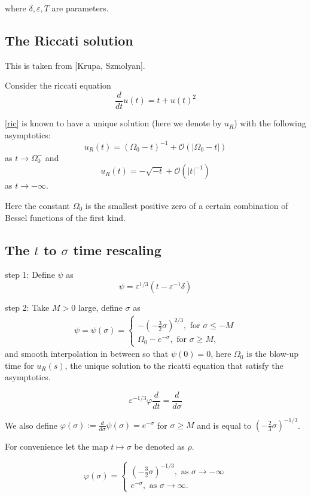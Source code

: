\documentclass[letterpaper,11pt]{article}
\newcommand{\rmO}{\mathcal{O}}
\newcommand{\eps}{\varepsilon}
\numberwithin{equation}{section}
\theoremstyle{plain}
\begin{document}
where $\delta,\eps, T$ are parameters.

\subsection{The Riccati solution}
This is taken from [Krupa, Szmolyan].

Consider the riccati equation
\begin{equation}\label{ric}
\frac{d}{dt}u(t) = t+u(t)^2
\end{equation}

\eqref{ric} is known to have a unique solution (here we denote by $u_R$) with the following asymptotics:
\[
u_R(t) = (\Omega_0-t)^{-1} + \rmO(|\Omega_0-t|)
\] as $t \to \Omega_0^-$ and
\[
u_R(t) = -\sqrt{-t} + \rmO( |t|^{-1})
\] as $t \to -\infty$.

Here the constant $\Omega_0$ is the smallest positive zero of a certain combination of Bessel functions of the first kind. 

\subsection{The \texorpdfstring{$t$}{t} to \texorpdfstring{$\sigma$}{sigma} time rescaling}

step 1: Define $\psi$ as
\[
\psi = \eps^{1/3}(t - \eps^{-1}\delta)
\]

step 2:
Take $M>0$ large, define $\sigma$ as
\begin{align*}
\psi = \psi(\sigma) =\begin{cases}
-(-\frac{3}{2} \sigma)^{2/3} , \text{ for }\sigma \le -M\\
\Omega_0 -e^{-\sigma}, \text{ for }\sigma \ge M,
\end{cases}
\end{align*}
and smooth interpolation in between so that $\psi(0) = 0$, here $\Omega_0$ is the blow-up time for $u_R(s)$, the unique solution to the ricatti equation that satisfy the asymptotics.

\[
\eps^{-1/3}\varphi \frac{d}{dt} = \frac{d}{d\sigma}
\]

We also define $\varphi(\sigma) := \frac{d}{d\sigma}\psi(\sigma) = e^{-\sigma} $ for $\sigma\ge M$ and is equal to $(-\frac{2}{3}\sigma)^{-1/3}$.

For convenience let the map $t \mapsto \sigma$ be denoted as $\rho$.

\iffalse
\begin{equation*}
\varphi(\sigma) =\begin{cases}
 (-\frac{3}{2}\sigma)^{-1/3}, \text{ as }\sigma \to -\infty\\
e^{-\sigma} , \text{ as }\sigma \to \infty.
\end{cases}
\end{equation*}
\end{document}
